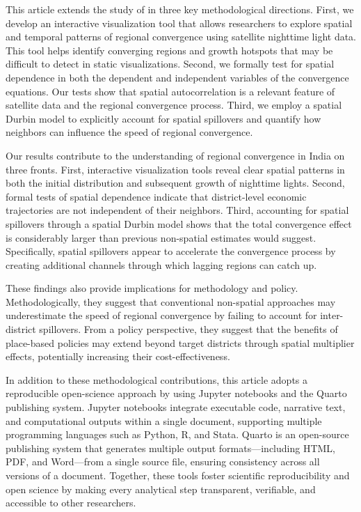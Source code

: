 \documentclass[
  a4paper, 
  twoside,
  review
]{article}
\newcounter{code}
\begin{document}
This article extends the study of
\citet{chanda_kabiraj_district_convergence} in three key methodological
directions. First, we develop an interactive visualization tool that
allows researchers to explore spatial and temporal patterns of regional
convergence using satellite nighttime light data. This tool helps
identify converging regions and growth hotspots that may be difficult to
detect in static visualizations. Second, we formally test for spatial
dependence in both the dependent and independent variables of the
convergence equations. Our tests show that spatial autocorrelation is a
relevant feature of satellite data and the regional convergence process.
Third, we employ a spatial Durbin model to explicitly account for
spatial spillovers and quantify how neighbors can influence the speed of
regional convergence.

Our results contribute to the understanding of regional convergence in
India on three fronts. First, interactive visualization tools reveal
clear spatial patterns in both the initial distribution and subsequent
growth of nighttime lights. Second, formal tests of spatial dependence
indicate that district-level economic trajectories are not independent
of their neighbors. Third, accounting for spatial spillovers through a
spatial Durbin model shows that the total convergence effect is
considerably larger than previous non-spatial estimates would suggest.
Specifically, spatial spillovers appear to accelerate the convergence
process by creating additional channels through which lagging regions
can catch up.

These findings also provide implications for methodology and policy.
Methodologically, they suggest that conventional non-spatial approaches
may underestimate the speed of regional convergence by failing to
account for inter-district spillovers. From a policy perspective, they
suggest that the benefits of place-based policies may extend beyond
target districts through spatial multiplier effects, potentially
increasing their cost-effectiveness.

In addition to these methodological contributions, this article adopts a
reproducible open-science approach by using Jupyter notebooks and the
Quarto publishing system. Jupyter notebooks integrate executable code,
narrative text, and computational outputs within a single document,
supporting multiple programming languages such as Python, R, and Stata.
Quarto is an open-source publishing system that generates multiple
output formats---including HTML, PDF, and Word---from a single source
file, ensuring consistency across all versions of a document. Together,
these tools foster scientific reproducibility and open science by making
every analytical step transparent, verifiable, and accessible to other
researchers.
\end{document}
